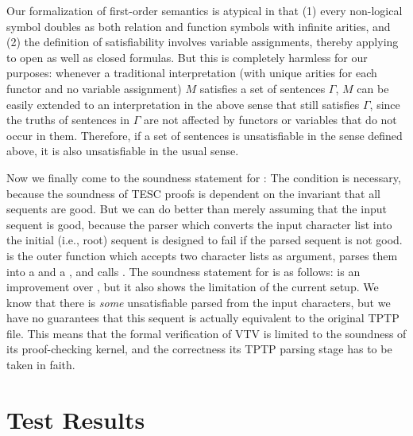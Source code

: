 \documentclass[12pt]{article}
\begin{document}
Our formalization of first-order semantics is atypical in that (1) every non-logical 
symbol doubles as both relation and function symbols with infinite arities, and 
(2) the definition of satisfiability involves variable assignments, thereby applying to
open as well as closed formulas. But this is completely harmless for our purposes:
whenever a traditional interpretation (with unique arities for each functor and no 
variable assignment) $M$ satisfies a set of sentences $\Gamma$, $M$ can be easily extended 
to an interpretation in the above sense that still satisfies $\Gamma$, since the 
truths of sentences in $\Gamma$ are not affected by functors or variables that do not 
occur in them. Therefore, if a set of sentences is unsatisfiable in the sense defined 
above, it is also unsatisfiable in the usual sense. 

Now we finally come to the soundness statement for :
The condition \AgdaSpace{} is necessary, because 
the soundness of TESC proofs is dependent on the invariant that all sequents are good. 
But we can do better than merely assuming that the input sequent is good,
because the parser which converts the input character list into the initial (i.e., root) 
sequent is designed to fail if the parsed sequent is not good. 
is the outer function which accepts two character lists as argument, parses them 
into a  and a , and calls .
The soundness statement for  is as follows:
 is an improvement over ,
but it also shows the limitation of the current setup. We know that there is 
\textit{some} unsatisfiable  parsed from the input characters, 
but we have no guarantees that this sequent is actually equivalent to the original
TPTP file. This means that the formal verification of VTV is limited to the soundness 
of its proof-checking kernel, and the correctness its TPTP parsing stage has to be 
taken in faith.



\section{Test Results} \label{sec:test-results}
\end{document}
